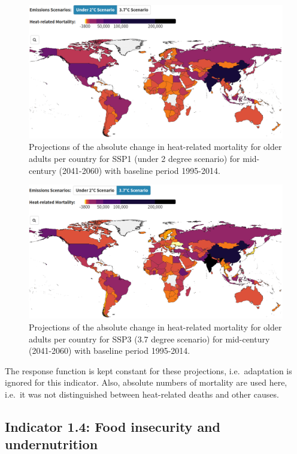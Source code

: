 \documentclass[
]{krantz}
\begin{document}
\begin{figure}

{\centering \includegraphics[width=0.8\linewidth]{work/08-lancet/figures/indicator_2_4} 

}

\caption{Projections of the absolute change in heat-related mortality for older adults per country for SSP1 (under 2 degree scenario) for mid-century (2041-2060) with baseline period 1995-2014.}\label{fig:mortality2ssp1strobl}
\end{figure}
\begin{figure}

{\centering \includegraphics[width=0.8\linewidth]{work/08-lancet/figures/indicator_2_5} 

}

\caption{Projections of the absolute change in heat-related mortality for older adults per country for SSP3 (3.7 degree scenario) for mid-century (2041-2060) with baseline period 1995-2014.}\label{fig:mortality2ssp3strobl}
\end{figure}

The response function is kept constant for these projections, i.e.~adaptation is ignored for this indicator. Also, absolute numbers of mortality are used here, i.e.~it was not distinguished between heat-related deaths and other causes.

\subsection{Indicator 1.4: Food insecurity and undernutrition}\label{indicator-1.4-food-insecurity-and-undernutrition}
\end{document}
